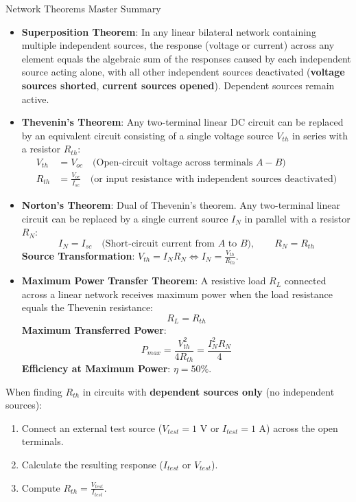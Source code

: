 \begin{formulabox}{Network Theorems Master Summary}
\begin{itemize}[leftmargin=1.5em]
    \item \textbf{Superposition Theorem}: In any linear bilateral network containing multiple independent sources, the response (voltage or current) across any element equals the algebraic sum of the responses caused by each independent source acting alone, with all other independent sources deactivated (\textbf{voltage sources shorted}, \textbf{current sources opened}). Dependent sources remain active.
    \item \textbf{Thevenin's Theorem}: Any two-terminal linear DC circuit can be replaced by an equivalent circuit consisting of a single voltage source $V_{th}$ in series with a resistor $R_{th}$:
    \begin{align*}
        V_{th} &= V_{oc} \quad \text{(Open-circuit voltage across terminals } A-B) \\
        R_{th} &= \frac{V_{oc}}{I_{sc}} \quad \text{(or input resistance with independent sources deactivated)}
    \end{align*}
    \item \textbf{Norton's Theorem}: Dual of Thevenin's theorem. Any two-terminal linear circuit can be replaced by a single current source $I_N$ in parallel with a resistor $R_N$:
    \[ I_N = I_{sc} \quad \text{(Short-circuit current from } A \text{ to } B), \qquad R_N = R_{th} \]
    \textbf{Source Transformation}: $V_{th} = I_N R_N \iff I_N = \frac{V_{th}}{R_{th}}$.
    \item \textbf{Maximum Power Transfer Theorem}:
    A resistive load $R_L$ connected across a linear network receives maximum power when the load resistance equals the Thevenin resistance:
    \[ R_L = R_{th} \]
    \textbf{Maximum Transferred Power}:
    \[ P_{max} = \frac{V_{th}^2}{4 R_{th}} = \frac{I_N^2 R_N}{4} \]
    \textbf{Efficiency at Maximum Power}: $\eta = 50\%$.
\end{itemize}
\end{formulabox}

\begin{examtip}
When finding $R_{th}$ in circuits with \textbf{dependent sources only} (no independent sources):
\begin{enumerate}
    \item Connect an external test source ($V_{test} = 1\text{ V}$ or $I_{test} = 1\text{ A}$) across the open terminals.
    \item Calculate the resulting response ($I_{test}$ or $V_{test}$).
    \item Compute $R_{th} = \frac{V_{test}}{I_{test}}$.
\end{enumerate}
\end{examtip}

